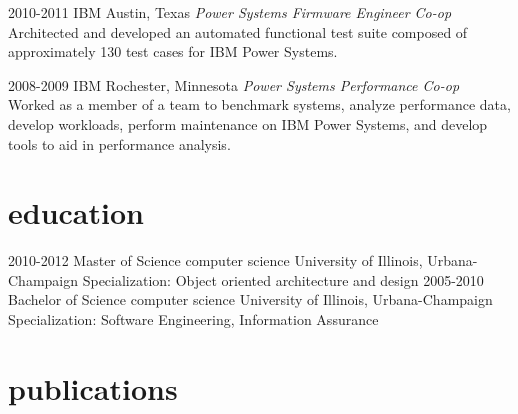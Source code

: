 \documentclass{friggeri-cv} %
\begin{document}
\begin{entrylist}
\entry
{2010-2011}
{IBM}
{Austin, Texas}
{\emph{Power Systems Firmware Engineer Co-op} \\
Architected and developed an automated functional test suite composed of approximately 130 test cases for IBM Power Systems.}
\end{entrylist}
\begin{entrylist}
\entry
{2008-2009}
{IBM}
{Rochester, Minnesota}
{\emph{Power Systems Performance Co-op} \\
Worked as a member of a team to benchmark systems, analyze performance data, develop workloads, perform
maintenance on IBM Power Systems, and develop tools to aid in performance analysis. }
\end{entrylist}


\section{education}

\begin{entrylist}
\entry
{2010-2012}
{Master of Science {\normalfont computer science}}
{University of Illinois, Urbana-Champaign}
{Specialization: Object oriented architecture and design}
\entry
{2005-2010}
{Bachelor of Science {\normalfont computer science}}
{University of Illinois, Urbana-Champaign}
{Specialization: Software Engineering, Information Assurance}
\end{entrylist}


\section{publications}





\end{document}
